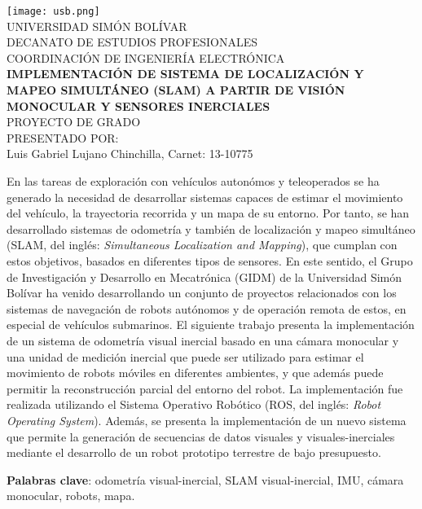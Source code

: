\begin{titlepage}
    \begin{center}

        \texttt{[image: usb.png]} \\
        \textsc {\large UNIVERSIDAD SIMÓN BOLÍVAR} \\
        \textsc{DECANATO DE ESTUDIOS PROFESIONALES\\
        COORDINACIÓN DE INGENIERÍA ELECTRÓNICA}\\
        \textbf{IMPLEMENTACIÓN DE SISTEMA DE LOCALIZACIÓN Y MAPEO SIMULTÁNEO (SLAM) A PARTIR DE VISIÓN MONOCULAR Y SENSORES INERCIALES} \\
        PROYECTO DE GRADO \\
        PRESENTADO POR: \\
        Luis Gabriel Lujano Chinchilla, Carnet: 13-10775

    \end{center}
\abstract
{
	En las tareas de exploración con vehículos autonómos y teleoperados se ha generado la necesidad de desarrollar sistemas capaces de estimar el movimiento del vehículo, la trayectoria recorrida y un mapa de su entorno. Por tanto, se han desarrollado sistemas de odometría y  también de localización y mapeo simultáneo (SLAM, del inglés: \textit{Simultaneous Localization and Mapping}), que cumplan con estos objetivos, basados en diferentes tipos de sensores. En este sentido, el Grupo de Investigación y Desarrollo en Mecatrónica (GIDM) de la Universidad Simón Bolívar ha venido desarrollando un conjunto de proyectos relacionados con los sistemas de navegación de robots autónomos y de operación remota de estos,  en especial de vehículos submarinos. El siguiente trabajo presenta la implementación de un sistema de odometría visual inercial basado en una cámara monocular y una unidad de medición inercial que puede ser utilizado para estimar el movimiento de robots móviles en diferentes ambientes, y que además puede permitir la reconstrucción parcial del entorno del robot. La implementación fue realizada utilizando el Sistema Operativo Robótico (ROS, del inglés: \textit{Robot Operating System}).  Además, se presenta la implementación de un nuevo sistema que permite la generación de secuencias de datos visuales y visuales-inerciales mediante el desarrollo de un robot prototipo terrestre de bajo presupuesto.
	
   
    
}

\noindent \begin{small} \textbf{Palabras clave}: odometría visual-inercial, SLAM visual-inercial, IMU, cámara monocular, robots, mapa. 
\end{small}
	
\clearpage
{}

\end{titlepage}
